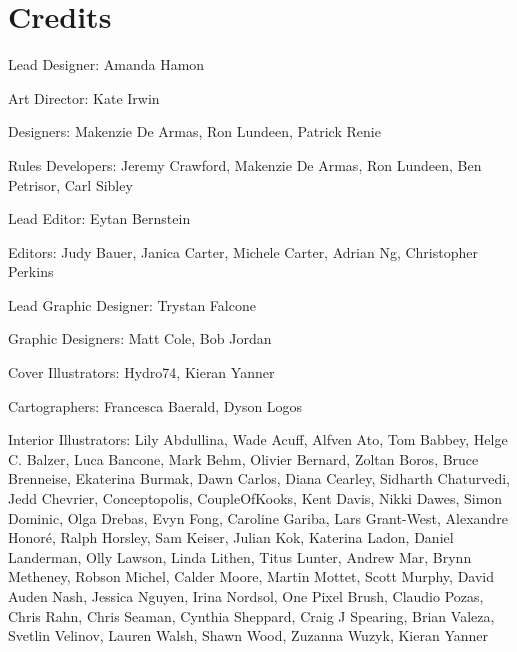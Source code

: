 \documentclass[10pt,a4paper,twoside,bg=print,twocolumn,openany,nodeprecatedcode]{dndbook}
\begin{document}
\chapter{Credits}

\begin{description}
\begin{multicols}{2}
\item[Lead Designer:]
Amanda Hamon

\item[Art Director:]
Kate Irwin

\item[Designers:]
Makenzie De Armas, Ron Lundeen, Patrick Renie

\item[Rules Developers:]
Jeremy Crawford, Makenzie De Armas, Ron Lundeen, Ben Petrisor, Carl Sibley

\item[Lead Editor:]
Eytan Bernstein

\item[Editors:]
Judy Bauer, Janica Carter, Michele Carter, Adrian Ng, Christopher Perkins

\item[Lead Graphic Designer:]
Trystan Falcone

\item[Graphic Designers:]
Matt Cole, Bob Jordan

\item[Cover Illustrators:]
Hydro74, Kieran Yanner

\item[Cartographers:]
Francesca Baerald, Dyson Logos

\item[Interior Illustrators:]
Lily Abdullina, Wade Acuff, Alfven Ato, Tom Babbey, Helge C. Balzer, Luca Bancone, Mark Behm, Olivier Bernard, Zoltan Boros, Bruce Brenneise, Ekaterina Burmak, Dawn Carlos, Diana Cearley, Sidharth Chaturvedi, Jedd Chevrier, Conceptopolis, CoupleOfKooks, Kent Davis, Nikki Dawes, Simon Dominic, Olga Drebas, Evyn Fong, Caroline Gariba, Lars Grant-West, Alexandre Honoré, Ralph Horsley, Sam Keiser, Julian Kok, Katerina Ladon, Daniel Landerman, Olly Lawson, Linda Lithen, Titus Lunter, Andrew Mar, Brynn Metheney, Robson Michel, Calder Moore, Martin Mottet, Scott Murphy, David Auden Nash, Jessica Nguyen, Irina Nordsol, One Pixel Brush, Claudio Pozas, Chris Rahn, Chris Seaman, Cynthia Sheppard, Craig J Spearing, Brian Valeza, Svetlin Velinov, Lauren Walsh, Shawn Wood, Zuzanna Wuzyk, Kieran Yanner


\end{multicols}
\end{description}
\end{document}
